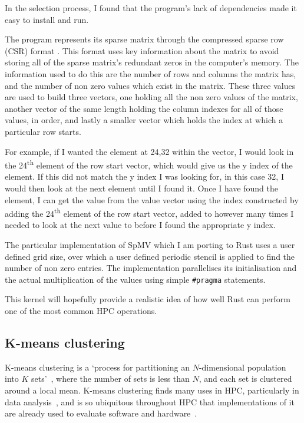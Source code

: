 In the selection process, I found that the program's lack of dependencies made it easy to install and run.

The program represents its sparse matrix through the compressed sparse row (CSR) format . This format uses key information about the matrix to avoid storing all of the sparse matrix's redundant zeros in the computer's memory. The information used to do this are the number of rows and columns the matrix has, and the number of non zero values which exist in the matrix. These three values are used to build three vectors, one holding all the non zero values of the matrix, another vector of the same length holding the column indexes for all of those values, in order, and lastly a smaller vector which holds the index at which a particular row starts.

For example, if I wanted the element at 24,32 within the vector, I would look in the 24\textsuperscript{th} element of the row start vector, which would give us the y index of the element. If this did not match the y index I was looking for, in this case 32, I would then look at the next element until I found it. Once I have found the element, I can get the value from the value vector using the index constructed by adding the 24\textsuperscript{th} element of the row start vector, added to however many times I needed to look at the next value to before I found the appropriate y index.

The particular implementation of SpMV which I am porting to Rust uses a user defined grid size, over which a user defined periodic stencil is applied to find the number of non zero entries. The implementation parallelises its initialisation and the actual multiplication of the values using simple \texttt{\#pragma} statements.

This kernel will hopefully provide a realistic idea of how well Rust can perform one of the most common HPC operations.

\subsection{K-means clustering}

K-means clustering is a `process for partitioning an $N$-dimensional population into $K$ sets'~\cite{macqueen1967}, where the number of sets is less than $N$, and each set is clustered around a local mean. K-means clustering finds many uses in HPC, particularly in data analysis~\cite{DBLP:journals/corr/ChakrabortyND14a, ordovas2014fast}, and is so ubiquitous throughout HPC that implementations of it are already used to evaluate software and hardware~\cite{Yang2014}.

